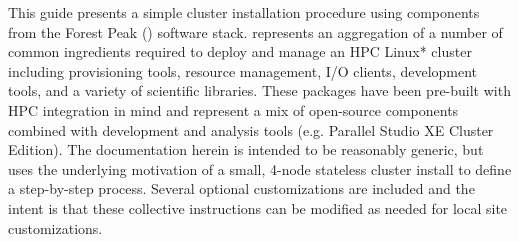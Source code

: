 This guide presents a simple cluster installation procedure using components
from the Forest Peak (\FSP{}) software stack. \FSP{} represents an aggregation
of a number of common ingredients required to deploy and manage an HPC Linux*
cluster including provisioning tools, resource management, I/O clients,
development tools, and a variety of scientific libraries. These packages have
been pre-built with HPC integration in mind and represent a mix of open-source
components combined with \Intel{} development and analysis tools (e.g. \Intel{}
Parallel Studio XE Cluster Edition).
The documentation herein is intended to be reasonably generic, but uses the
underlying motivation of a small, 4-node stateless cluster install to define a step-by-step
process. Several optional customizations are included and the intent is that
these collective instructions can be modified as needed for local site
customizations. 
